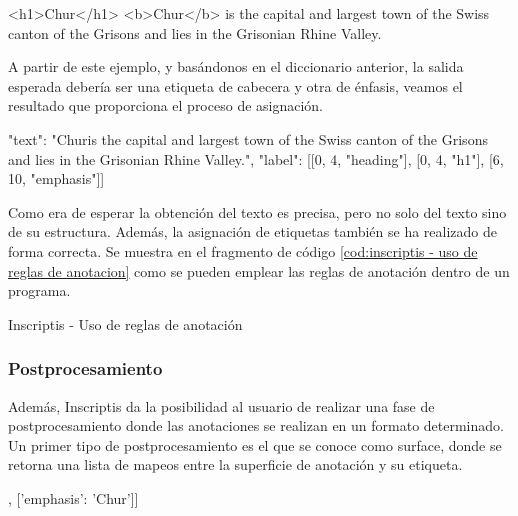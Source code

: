 \begin{Schunk}
  \begin{Soutput}
    <h1>Chur</h1>
    <b>Chur</b> is the capital and largest town of the Swiss 
    canton of the Grisons and lies in the Grisonian Rhine Valley.
  \end{Soutput}
\end{Schunk}

A partir de este ejemplo, y basándonos en el diccionario anterior, la salida esperada debería ser una 
etiqueta de cabecera y otra de énfasis, veamos el resultado que proporciona el proceso de asignación.

\begin{Schunk}
  \begin{Soutput}
    {
      "text": "Chur\n\nChur is the capital and largest town of the Swiss 
              canton of the Grisons and lies in the Grisonian Rhine Valley.",
      "label": [[0, 4, "heading"], [0, 4, "h1"], [6, 10, "emphasis"]]
    }
  \end{Soutput}
\end{Schunk}

Como era de esperar la obtención del texto es precisa, pero no solo del texto sino de su estructura. Además,
la asignación de etiquetas también se ha realizado de forma correcta. Se muestra en el fragmento de código
\ref{cod:inscriptis - uso de reglas de anotacion} como se pueden emplear las reglas de anotación dentro de un programa.

\begin{codefloat}
  
  \caption{Inscriptis - Uso de reglas de anotación}
  \label{cod:inscriptis - uso de reglas de anotacion}
\end{codefloat}

\subsubsection{Postprocesamiento}
\label{subsubsec:postprocesamiento}

Además, Inscriptis da la posibilidad al usuario de realizar una fase de postprocesamiento donde las
anotaciones se realizan en un formato determinado. Un primer tipo de postprocesamiento es el que se conoce 
como surface, donde se retorna una lista de mapeos entre la superficie de anotación y su etiqueta.

\begin{Schunk}
  \begin{Soutput}
    [['heading', 'Chur'],
      ['emphasis': 'Chur']]
  \end{Soutput}
\end{Schunk}

